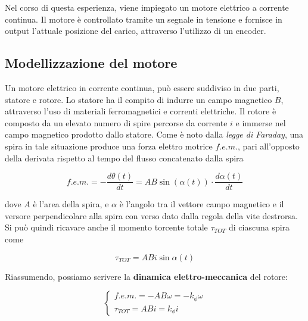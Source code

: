 \documentclass[english]{article}
\begin{document}
	Nel corso di questa esperienza, viene impiegato un motore elettrico a corrente continua. Il motore è controllato tramite un segnale in tensione e fornisce in output l'attuale posizione del carico, attraverso l'utilizzo di un encoder.
	
	\subsection{Modellizzazione del motore}
	\label{subsec:ModellizzazioneMotore}
	
		Un motore elettrico in corrente continua, può essere suddiviso in due parti, statore e rotore. \newline
		Lo statore ha il compito di indurre un campo magnetico $B$, attraverso l'uso di materiali ferromagnetici e correnti elettriche. \newline
		Il rotore è composto da un elevato numero di spire percorse da corrente $i$ e immerse nel campo magnetico prodotto dallo statore. \newline
		Come è noto dalla \textit{legge di Faraday}, una spira in tale situazione produce una forza elettro motrice $f.e.m.$, pari all'opposto della derivata rispetto al tempo del flusso concatenato dalla spira
	
		\begin{equation}
			f.e.m. = -\frac{d\theta(t)}{dt} = AB\sin(\alpha(t))\cdot\frac{d\alpha(t)}{dt}
			\label{eq:fem}
		\end{equation}
	
		\noindent dove $A$ è l'area della spira, e $\alpha$ è l'angolo tra il vettore campo magnetico e il versore perpendicolare alla spira con verso dato dalla regola della vite destrorsa. \newline
		Si può quindi ricavare anche il momento torcente totale $\tau_{TOT}$ di ciascuna spira come
	
		\begin{equation}
			\tau_{TOT} = ABi\sin{\alpha(t)}
			\label{eq:momentoTorcente}
		\end{equation} 
	
		\noindent Riassumendo, possiamo scrivere la \textbf{dinamica elettro-meccanica} del rotore:
		
		\begin{equation}
			\begin{cases}
				f.e.m. = -AB\omega = -k_{\phi}\omega \\
				\tau_{TOT} = ABi = k_{\phi}i
			\end{cases}
			\label{eq:dinamecaElettroMeccanica}
		\end{equation}
	
\end{document}
